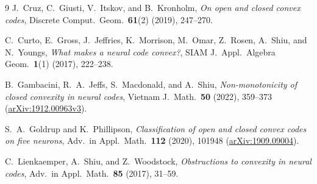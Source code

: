 \documentclass[11pt]{article}
\theoremstyle{plain}
\theoremstyle{definition}
\theoremstyle{remark}
\begin{document}
\begin{thebibliography}{9}
J.~Cruz, C.~Giusti, V.~Itskov, and B.~Kronholm, \emph{On open and closed convex codes}, Discrete Comput.\ Geom.\ \textbf{61}(2) (2019), 247--270.

C.~Curto, E.~Gross, J.~Jeffries, K.~Morrison, M.~Omar, Z.~Rosen, A.~Shiu, and N.~Youngs, \emph{What makes a neural code convex?}, SIAM J.\ Appl.\ Algebra Geom.\ \textbf{1}(1) (2017), 222--238.

B.~Gambacini, R.~A.~Jeffs, S.~Macdonald, and A.~Shiu, \emph{Non-monotonicity of closed convexity in neural codes}, Vietnam J.\ Math.\ \textbf{50} (2022), 359--373 (\href{https://arxiv.org/abs/1912.00963}{arXiv:1912.00963v3}).

S.~A.~Goldrup and K.~Phillipson, \emph{Classification of open and closed convex codes on five neurons}, Adv.\ in Appl.\ Math.\ \textbf{112} (2020), 101948 (\href{https://arxiv.org/abs/1909.09004}{arXiv:1909.09004}).

C.~Lienkaemper, A.~Shiu, and Z.~Woodstock, \emph{Obstructions to convexity in neural codes}, Adv.\ in Appl.\ Math.\ \textbf{85} (2017), 31--59.
\end{thebibliography}
\end{document}
